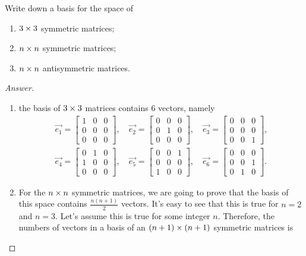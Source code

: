 \begin{exercise}
  Write down a basis for the space of
  \begin{enumerate}[label={\alph*).}]
    \item $3\times 3$ symmetric matrices;
    \item $n\times n$ symmetric matrices;
    \item $n\times n$ antisymmetric matrices.
  \end{enumerate}
\end{exercise}
\begin{proof}[Answer]
  \text{}
  \begin{enumerate}[label={\alph*).}]
    \item the basis of $3\times 3$ matrices contains 6 vectors, namely
      \begin{align*}
        \vec{e_1}= \begin{bmatrix} 1&0&0 \\ 0&0&0 \\ 0&0&0 \end{bmatrix},\quad
        \vec{e_2}= \begin{bmatrix} 0&0&0 \\ 0&1&0 \\ 0&0&0 \end{bmatrix},\quad
        \vec{e_3}= \begin{bmatrix} 0&0&0 \\ 0&0&0 \\ 0&0&1 \end{bmatrix},\\[0.4cm]
        \vec{e_4}= \begin{bmatrix} 0&1&0 \\ 1&0&0 \\ 0&0&0 \end{bmatrix},\quad
        \vec{e_5}= \begin{bmatrix} 0&0&1 \\ 0&0&0 \\ 1&0&0 \end{bmatrix},\quad
        \vec{e_6}= \begin{bmatrix} 0&0&0 \\ 0&0&1 \\ 0&1&0 \end{bmatrix}.
      \end{align*}
    \item For the $n\times n$ symmetric matrices, we are going to prove that
      the basis of this space contains $\frac{n(n+1)}{2}$ vectors.
      It's easy to see that this is true for $n=2$ and $n=3$.
      Let's assume this is true for some integer $n$. Therefore, the 
      numbers of vectors in a basis of an $(n+1)\times (n+1)$ symmetric matrices is
  \end{enumerate}
\end{proof}
